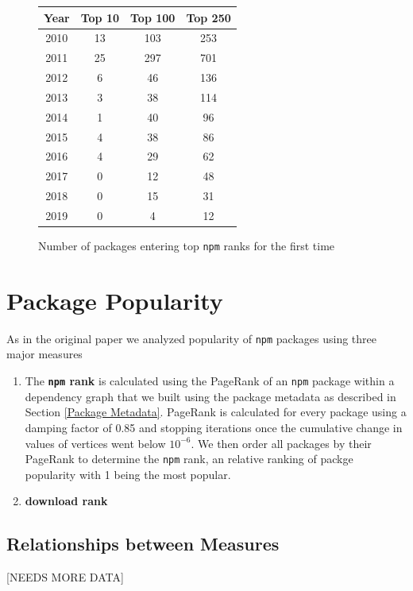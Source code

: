 \documentclass[10pt,conference]{IEEEtran}
\def\code#1{\texttt{#1}}
\begin{document}
  \begin{figure}
    \begin{tabular}{c|c|c|c}
      Year & Top 10 & Top 100 & Top 250 \\
      \hline
      2010 & 13 & 103 & 253\\
      2011 & 25 & 297 & 701\\
      2012 & 6 & 46 & 136\\
      2013 & 3 & 38 & 114\\
      2014 & 1 & 40 & 96\\
      2015 & 4 & 38 & 86\\
      2016 & 4 & 29 & 62\\
      2017 & 0 & 12 & 48\\
      2018 & 0 & 15 & 31\\
      2019 & 0 & 4 & 12\\
    \end{tabular}
    \caption{Number of packages entering top \code{npm} ranks for the first time}
    \label{numEnteringTop}
  \end{figure}


  \section{Package Popularity}

  As in the original paper we analyzed popularity of \code{npm} packages using three major measures
  \begin{enumerate}
    \item The \textbf{\code{npm} rank} is calculated using the PageRank\cite{brin1998anatomy} of an \code{npm} package within a dependency graph that we built using the
      package metadata as described in Section \ref{Package Metadata}. PageRank is calculated for every package using a damping factor of 0.85 
      and stopping iterations once the cumulative change in values of vertices went below $10^{-6}$. We then order all packages by their PageRank to determine the
      \code{npm} rank, an relative ranking of packge popularity with 1 being the most popular.
    \item \textbf{download rank}
  \end{enumerate}



  \subsection{Relationships between Measures}
  [NEEDS MORE DATA]
\end{document}
